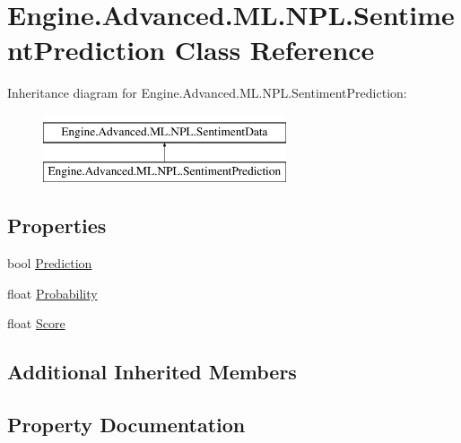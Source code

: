 \hypertarget{class_engine_1_1_advanced_1_1_m_l_1_1_n_p_l_1_1_sentiment_prediction}{}\section{Engine.\+Advanced.\+M\+L.\+N\+P\+L.\+Sentiment\+Prediction Class Reference}
\label{class_engine_1_1_advanced_1_1_m_l_1_1_n_p_l_1_1_sentiment_prediction}
Inheritance diagram for Engine.\+Advanced.\+M\+L.\+N\+P\+L.\+Sentiment\+Prediction\+:\begin{figure}[H]
\begin{center}
\leavevmode
\includegraphics[height=2.000000cm]{class_engine_1_1_advanced_1_1_m_l_1_1_n_p_l_1_1_sentiment_prediction}
\end{center}
\end{figure}
\subsection*{Properties}
\begin{DoxyCompactItemize}
\item 
bool \mbox{\hyperlink{class_engine_1_1_advanced_1_1_m_l_1_1_n_p_l_1_1_sentiment_prediction_a3e940c20f5dad5d32de9e99306bb03ef}{Prediction}}
\item 
float \mbox{\hyperlink{class_engine_1_1_advanced_1_1_m_l_1_1_n_p_l_1_1_sentiment_prediction_a2cf2b5266c1036a48ebc8efa6d68fd2c}{Probability}}
\item 
float \mbox{\hyperlink{class_engine_1_1_advanced_1_1_m_l_1_1_n_p_l_1_1_sentiment_prediction_a9749ee46bd4b22528c9bd74b1b191303}{Score}}
\end{DoxyCompactItemize}
\subsection*{Additional Inherited Members}


\subsection{Property Documentation}
\mbox{\label{class_engine_1_1_advanced_1_1_m_l_1_1_n_p_l_1_1_sentiment_prediction_a3e940c20f5dad5d32de9e99306bb03ef}} 
